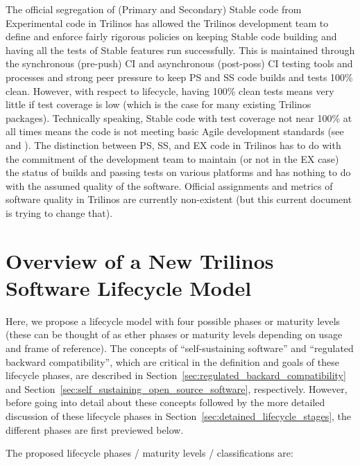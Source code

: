 \documentclass[11pt]{SANDreport}
\begin{document}
The official segregation of (Primary and Secondary) Stable code from
Experimental code in Trilinos has allowed the Trilinos development
team to define and enforce fairly rigorous policies on keeping Stable
code building and having all the tests of Stable features run
successfully.  This is maintained through the synchronous (pre-push)
CI and asynchronous (post-poss) CI testing tools and processes and
strong peer pressure to keep PS and SS code builds and tests 100\%
clean.  However, with respect to lifecycle, having 100\% clean tests
means very little if test coverage is low (which is the case for many
existing Trilinos packages).  Technically speaking, Stable code with
test coverage not near 100\% at all times means the code is not
meeting basic Agile development standards (see {}\cite{XP2} and
{}\cite{CodeComplete2nd04}).  The distinction between PS, SS, and EX
code in Trilinos has to do with the commitment of the development team
to maintain (or not in the EX case) the status of builds and passing
tests on various platforms and has nothing to do with the assumed
quality of the software.  Official assignments and metrics of software
quality in Trilinos are currently non-existent (but this current
document is trying to change that).


%
{}\section{Overview of a New Trilinos Software Lifecycle Model}
\label{sec:life_cycle_overview}
%

Here, we propose a lifecycle model with four possible phases or
maturity levels (these can be thought of as ether phases or maturity
levels depending on usage and frame of reference).  The concepts of
``self-sustaining software'' and ``regulated backward compatibility'',
which are critical in the definition and goals of these lifecycle
phases, are described in
Section~\ref{sec:regulated_backard_compatibility} and
Section~\ref{sec:self_sustaining_open_source_software}, respectively.
However, before going into detail about these concepts followed by the
more detailed discussion of these lifecycle phases in
Section~\ref{sec:detained_lifecycle_stages}, the different phases are
first previewed below.

The proposed lifecycle phases / maturity levels / classifications are:
\end{document}
